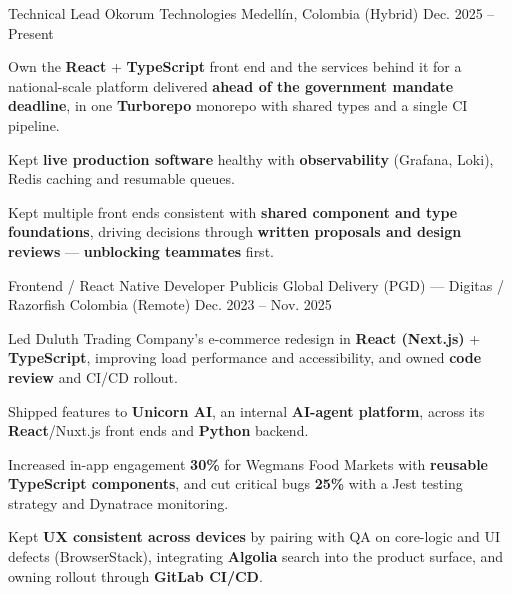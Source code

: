 \newcommand{\quotes}[1]{``#1''}

\begin{cventries}

  \cventry
  {Technical Lead}
  {Okorum Technologies}
  {Medellín, Colombia (Hybrid)}
  {Dec. 2025 -- Present}
  {
    \begin{cvitems}
      \item {Own the \textbf{React} + \textbf{TypeScript} front end and the services behind it for a national-scale platform delivered \textbf{ahead of the government mandate deadline}, in one \textbf{Turborepo} monorepo with shared types and a single CI pipeline.}
      \item {Kept \textbf{live production software} healthy with \textbf{observability} (Grafana, Loki), Redis caching and resumable queues.}
      \item {Kept multiple front ends consistent with \textbf{shared component and type foundations}, driving decisions through \textbf{written proposals and design reviews} --- \textbf{unblocking teammates} first.}
    \end{cvitems}
  }

  \cventry
  {Frontend / React Native Developer}
  {Publicis Global Delivery (PGD) — Digitas / Razorfish}
  {Colombia (Remote)}
  {Dec. 2023 -- Nov. 2025}
  {
    \begin{cvitems}
      \item {Led Duluth Trading Company's e-commerce redesign in \textbf{React (Next.js)} + \textbf{TypeScript}, improving load performance and accessibility, and owned \textbf{code review} and CI/CD rollout.}
      \item {Shipped features to \textbf{Unicorn AI}, an internal \textbf{AI-agent platform}, across its \textbf{React}/Nuxt.js front ends and \textbf{Python} backend.}
      \item {Increased in-app engagement \textbf{30\%} for Wegmans Food Markets with \textbf{reusable TypeScript components}, and cut critical bugs \textbf{25\%} with a Jest testing strategy and Dynatrace monitoring.}
      \item {Kept \textbf{UX consistent across devices} by pairing with QA on core-logic and UI defects (BrowserStack), integrating \textbf{Algolia} search into the product surface, and owning rollout through \textbf{GitLab CI/CD}.}
    \end{cvitems}
  }


\end{cventries}
